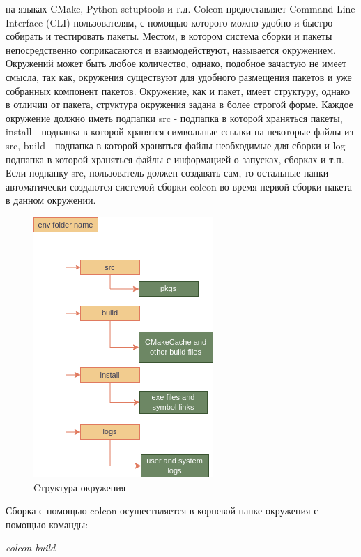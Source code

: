 \documentclass[a4paper, 14pt]{extreport}
\begin{document}
на языках CMake, Python setuptools и т.д. Colcon предоставляет Command Line Interface (CLI)\cite{cliBook}\cite{cliPrep} пользователям, с помощью которого можно
удобно и быстро собирать и тестировать пакеты. Местом, в котором система сборки и пакеты непосредственно соприкасаются и взаимодействуют,
называется окружением. Окружений может быть любое количество, однако, подобное зачастую не имеет смысла, так как, окружения существуют
для удобного размещения пакетов и уже собранных компонент пакетов. Окружение, как и пакет, имеет структуру, однако в отличии от пакета,
структура окружения задана в более строгой форме. Каждое окружение должно иметь подпапки src - подпапка в которой храняться пакеты,
install - подпапка в которой хранятся символьные ссылки на некоторые файлы из src, build - подпапка в которой храняться файлы необходимые
для сборки и log - подпапка в которой храняться файлы с информацией о запусках, сборках и т.п. Если подпапку src, пользователь
должен создавать сам, то остальные папки автоматически создаются системой сборки colcon во время первой сборки пакета в данном окружении.
\begin{figure}[ht]
\begin{center}
\includegraphics[scale = 0.5]{./figure/env_folder_schema}
\caption{Cтруктура окружения}
\label{fig:manip_photo}
\end{center}
\end{figure}
\par\noindent Сборка с помощью colcon осуществляется в корневой папке окружения с помощью команды:
\begin{center}
        \par \textsl{colcon build}
\end{center}
\end{document}
